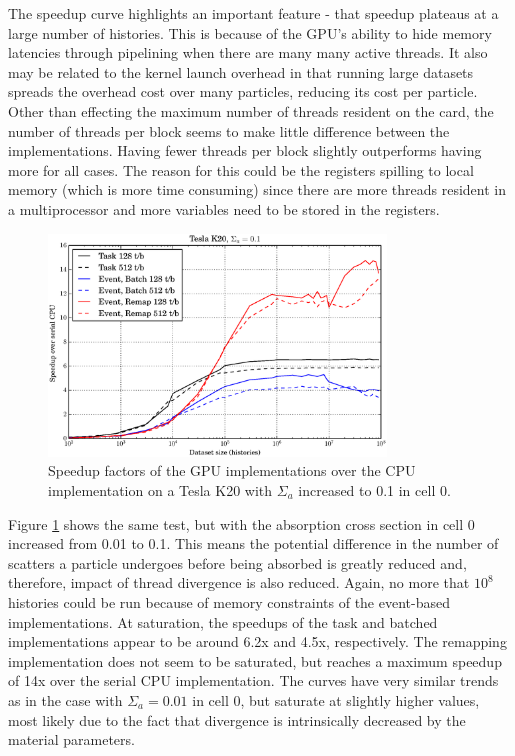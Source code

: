 The speedup curve highlights an important feature - that speedup plateaus at a large number of histories.  This is because of the GPU's ability to hide memory latencies through pipelining when there are many many active threads.  It also may be related to the kernel launch overhead in that running large datasets spreads the overhead cost over many particles, reducing its cost per particle.  Other than effecting the maximum number of threads resident on the card, the number of threads per block seems to make little difference between the implementations. Having fewer threads per block slightly outperforms having more for all cases.  The reason for this could be the registers spilling to local memory (which is more time consuming) since there are more threads resident in a multiprocessor and more variables need to be stored in the registers.%

\begin{figure}[h!] 
  \centering
    \includegraphics[width=0.8\textwidth]{graphics/prelim_speedup_01_k20.eps}
     \caption{Speedup factors of the GPU implementations over the CPU implementation on a Tesla K20 with $\Sigma_a$ increased to 0.1 in cell 0. \label{prelim_speedup_1} }
\end{figure}

Figure \ref{prelim_speedup_1} shows the same test, but with the absorption cross section in cell 0 increased from 0.01 to 0.1.  This means the potential difference in the number of scatters a particle undergoes before being absorbed is greatly reduced and, therefore, impact of thread divergence is also reduced.  Again, no more that $10^8$ histories could be run because of memory constraints of the event-based implementations.  At saturation, the speedups of the task and batched implementations appear to be around 6.2x and 4.5x, respectively.  The remapping implementation does not seem to be saturated, but reaches a maximum speedup of 14x over the serial CPU implementation. %
 The curves have very similar trends as in the case with $\Sigma_a=0.01$ in cell 0, but saturate at slightly higher values, most likely due to the fact that divergence is intrinsically decreased by the material parameters.

